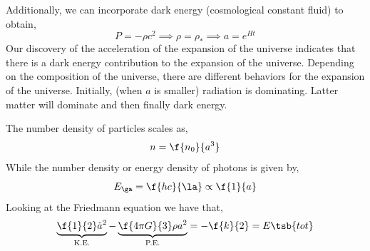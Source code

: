 \documentclass{article}
\begin{document}
Additionally, we can incorporate dark energy (cosmological constant fluid) to obtain,
\[ P = - \rho c^2 \implies \rho = \rho_{*} \implies a = e^{Ht}\]
Our discovery of the acceleration of the expansion of the universe indicates that there is a dark energy contribution to the expansion of the universe. Depending on the composition of the universe, there are different behaviors for the expansion of the universe. Initially, (when $a$ is smaller) radiation is dominating. Latter matter will dominate and then finally dark energy.
\begin{center}
\end{center}
The number density of particles scales as,
\[ n = \f{n_0}{a^3} \]
While the number density or energy density of photons is given by,
\[ E_{\ga} = \f{hc}{\la} \propto \f{1}{a} \]
Looking at the Friedmann equation we have that,
\[ \underbrace{\f{1}{2} \dot a^2}_{\text{K.E.}} - \underbrace{\f{4 \pi G}{3} \rho a^2}_{\text{P.E.}} = -\f{k}{2} = E\tsb{tot} \]
\end{document}
